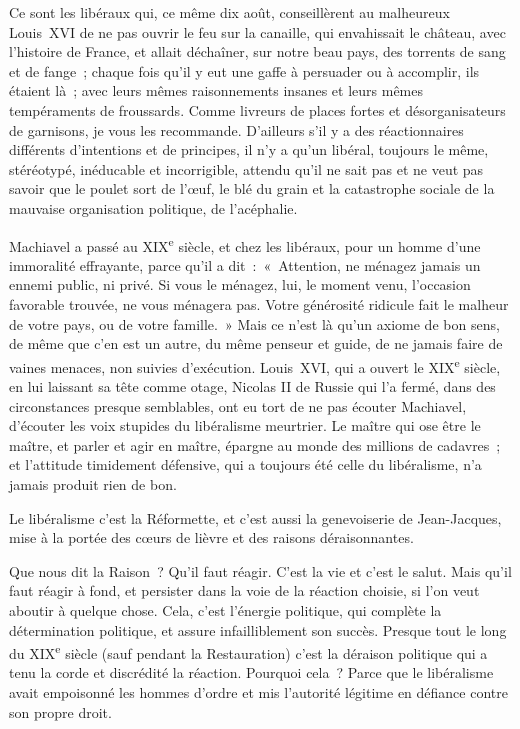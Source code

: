 \documentclass[french,twoside]{book} %
\begin{document}
Ce sont les libéraux qui, ce même dix août, conseillèrent au malheureux Louis XVI de ne pas ouvrir le feu sur la canaille, qui envahissait le château, avec l’histoire de France, et allait déchaîner, sur notre beau pays, des torrents de sang et de fange ; chaque fois qu’il y eut une gaffe à persuader ou à accomplir, ils étaient là ; avec leurs mêmes raisonnements insanes et leurs mêmes tempéraments de froussards. Comme livreurs de places fortes et désorganisateurs de garnisons, je vous les recommande. D’ailleurs s’il y a des réactionnaires différents d’intentions et de principes, il n’y a qu’un libéral, toujours le même, stéréotypé, inéducable et incorrigible, attendu qu’il ne sait pas et ne veut pas savoir que le poulet sort de l’œuf, le blé du grain et la catastrophe sociale de la mauvaise organisation politique, de l’acéphalie.\par
Machiavel a passé au XIX\textsuperscript{e} siècle, et chez les libéraux, pour un homme d’une immoralité effrayante, parce qu’il a dit : « Attention, ne ménagez jamais un ennemi public, ni privé. Si vous le ménagez, lui, le moment venu, l’occasion favorable trouvée, ne vous ménagera pas. Votre générosité ridicule fait le malheur de votre pays, ou de votre famille. » Mais ce n’est là qu’un axiome de bon sens, de même que c’en est un autre, du même penseur et guide, de ne jamais faire de vaines menaces, non suivies d’exécution. Louis XVI, qui a ouvert le XIX\textsuperscript{e} siècle, en lui laissant sa tête comme otage, Nicolas II de Russie qui l’a fermé, dans des circonstances presque semblables, ont eu tort de ne pas écouter Machiavel, d’écouter les voix stupides du libéralisme meurtrier. Le maître qui ose être le maître, et parler et agir en maître, épargne au monde des millions de cadavres ; et l’attitude timidement défensive, qui a toujours été celle du libéralisme, n’a jamais produit rien de bon.\par
Le libéralisme c’est la Réformette, et c’est aussi la genevoiserie de Jean-Jacques, mise à la portée des cœurs de lièvre et des raisons déraisonnantes.\par
Que nous dit la Raison ? Qu’il faut réagir. C’est la vie et c’est le salut. Mais qu’il faut réagir à fond, et persister dans la voie de la réaction choisie, si l’on veut aboutir à quelque chose. Cela, c’est l’énergie politique, qui complète la détermination politique, et assure infailliblement son succès. Presque tout le long du XIX\textsuperscript{e} siècle (sauf pendant la Restauration) c’est la déraison politique qui a tenu la corde et discrédité la réaction. Pourquoi cela ? Parce que le libéralisme avait empoisonné les hommes d’ordre et mis l’autorité légitime en défiance contre son propre droit.\par
\end{document}
